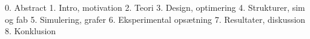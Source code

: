 0. Abstract
1. Intro, motivation
2. Teori
3. Design, optimering
4. Strukturer, sim og fab
5. Simulering, grafer
6. Eksperimental opsætning
7. Resultater, diskussion
8. Konklusion
